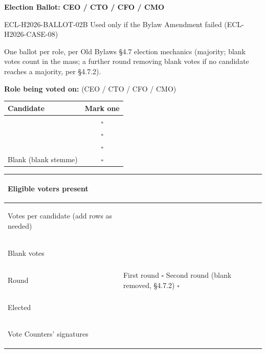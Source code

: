\documentclass{../../../Common/Latex/Templates/rapport}
\date{[DATE OF GENERAL ASSEMBLY: TBD]}
\begin{document}
\reportmainmatter
\small
\setlength{\parindent}{0pt}
\setlength{\tabcolsep}{6pt}
\renewcommand{\arraystretch}{1.3}

\begin{center}
  {\Large\bfseries Election Ballot: CEO / CTO / CFO / CMO}\par
  \vspace{0.15cm}
  {\normalsize ECL-H2026-BALLOT-02B \quad Used only if the Bylaw Amendment failed (ECL-H2026-CASE-08)}\par
\end{center}

\vspace{0.2cm}
One ballot per role, per Old Bylaws \S4.7 election mechanics (majority; blank votes count in the mass; a further round removing blank votes if no candidate reaches a majority, per \S4.7.2).

\vspace{0.3cm}
\textbf{Role being voted on:} \underline{\hspace{6cm}} \quad (CEO / CTO / CFO / CMO)

\vspace{0.4cm}
\begin{tabularx}{\textwidth}{|>{\raggedright\arraybackslash}X|c|}
  \hline
  \bfseries Candidate  & \bfseries Mark one \\
  \hline
  \rule{0pt}{0.9cm}    & $\square$          \\
  \hline
  \rule{0pt}{0.9cm}    & $\square$          \\
  \hline
  \rule{0pt}{0.9cm}    & $\square$          \\
  \hline
  Blank (blank stemme) & $\square$          \\
  \hline
\end{tabularx}

\vspace{0.6cm}
\begin{tabularx}{\textwidth}{|>{\bfseries\raggedright\arraybackslash}p{5.5cm}|X|}
  \hline
  Eligible voters present                  & \rule{0pt}{1.2cm}                                                                                             \\
  \hline
  Votes per candidate (add rows as needed) & \rule{0pt}{2.4cm}                                                                                             \\
  \hline
  Blank votes                              & \rule{0pt}{1.2cm}                                                                                             \\
  \hline
  Round                                    & \rule{0pt}{1.2cm}First round \quad $\square$ \quad\quad Second round (blank removed, \S4.7.2) \quad $\square$ \\
  \hline
  Elected                                  & \rule{0pt}{1.4cm}                                                                                             \\
  \hline
  Vote Counters' signatures                & \rule{0pt}{1.6cm}                                                                                             \\
  \hline
\end{tabularx}
\end{document}
